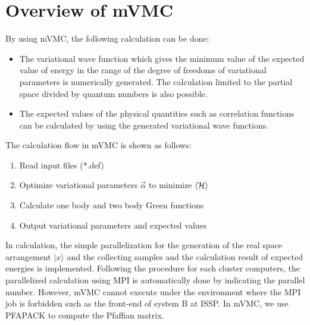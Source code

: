 \label{Ch:whatismVMC}
\section{Overview of mVMC}
By using mVMC, the following calculation can be done:
\begin{itemize}
\item{The variational wave function which gives the minimum value of the expected value of energy in the range of the degree of freedoms of variational parameters is numerically generated. The calculation limited to the partial space divided by quantum numbers is also possible. }
\item{The expected values of the physical quantities such as correlation functions can be calculated by using the generated variational wave functions.}
\end{itemize}

The calculation flow in mVMC is shown as follows:
\begin{enumerate}
\item{Read input files (*.def)}
\item{Optimize variational parameters $\vec{\alpha}$ to minimize $\langle {\cal H} \rangle$}
\item{Calculate one body and two body Green functions}
\item{Output variational parameters and expected values}
\end{enumerate}
In calculation, the simple parallelization for the generation of the real space arrangement $|x\rangle$ and the collecting samples and the calculation result of expected energies is implemented. Following the procedure for each cluster computers, the parallelized calculation using MPI is automatically done by indicating the parallel number. However, mVMC cannot execute under the environment where the MPI job is forbidden such as the front-end of system B at ISSP. In mVMC, we use PFAPACK\cite{PFAPACK} to compute the Pfaffian matrix.

